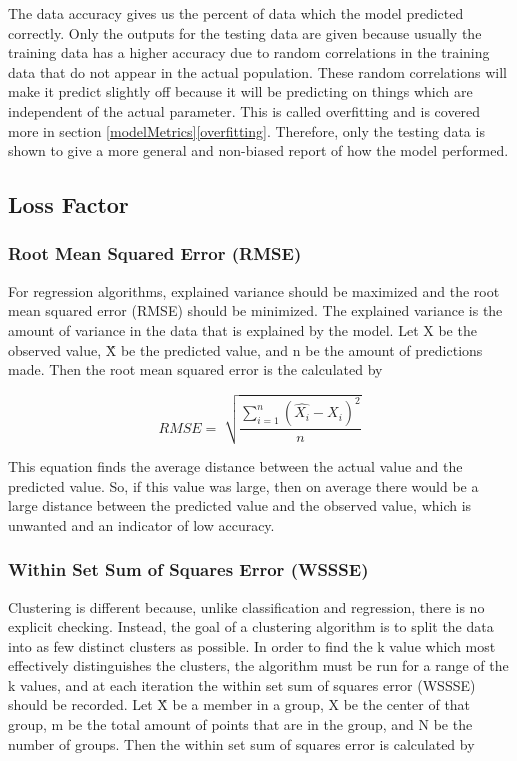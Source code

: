 \documentclass[9pt,twocolumn,twoside]{idsi}
\begin{document}
The data accuracy gives us the percent of data which the model predicted correctly. Only the outputs for the testing data are given because usually the training data has a higher accuracy due to random correlations in the training data that do not appear in the actual population. These random correlations will make it predict slightly off because it will be predicting on things which are independent of the actual parameter. This is called overfitting and is covered more in section \ref{modelMetrics}\ref{overfitting}. Therefore, only the testing data is shown to give a more general and non-biased report of how the model performed.

\subsection{Loss Factor} \label{lossFactor}

\subsubsection{Root Mean Squared Error (RMSE)} \label{rmse}

For regression algorithms, explained variance should be maximized and the root mean squared error (RMSE) should be minimized. 
The explained variance is the amount of variance in the data that is explained by the model. Let X be the observed value, \^{X} be the predicted value, and n be the amount of predictions made. Then the root mean squared error is the calculated by 

\begin{equation}
RMSE =\sqrt[]{\frac{\sum_{i=1}^{n} (\hat{X_i} - X_i)^2}{n}}
\label{eq:rmse}
\end{equation}

This equation finds the average distance between the actual value and the predicted value\cite{rms_error}. So, if this value was large, then on average there would be a large distance between the predicted value and the observed value, which is unwanted and an indicator of low accuracy.



\subsubsection{Within Set Sum of Squares Error (WSSSE)} \label{wssse}
Clustering is different because, unlike classification and regression, there is no explicit checking. Instead, the goal of a clustering algorithm is to split the data into as few distinct clusters as possible. In order to find the k value which most effectively distinguishes the clusters, the algorithm must be run for a range of the k values, and at each iteration the within set sum of squares error (WSSSE) should be recorded. Let \^{X} be a member in a group, X be the center of that group, m be the total amount of points that are in the group, and N be the number of groups. Then the within set sum of squares error is calculated by
\end{document}

